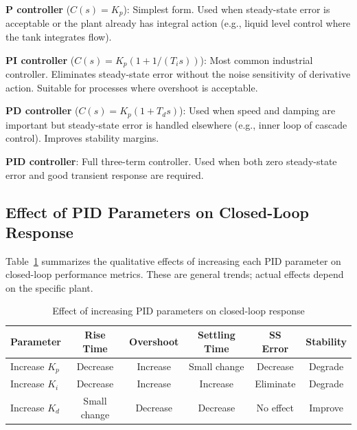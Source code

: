 \textbf{P controller} ($C(s) = K_p$): Simplest form. Used when steady-state error is acceptable or the plant already has integral action (e.g., liquid level control where the tank integrates flow).

\textbf{PI controller} ($C(s) = K_p(1 + 1/(T_i s))$): Most common industrial controller. Eliminates steady-state error without the noise sensitivity of derivative action. Suitable for processes where overshoot is acceptable.

\textbf{PD controller} ($C(s) = K_p(1 + T_d s)$): Used when speed and damping are important but steady-state error is handled elsewhere (e.g., inner loop of cascade control). Improves stability margins.

\textbf{PID controller}: Full three-term controller. Used when both zero steady-state error and good transient response are required.

\subsection{Effect of PID Parameters on Closed-Loop Response}
\label{subsec:pid_effects}

Table~\ref{tab:pid_effects} summarizes the qualitative effects of increasing each PID parameter on closed-loop performance metrics. These are general trends; actual effects depend on the specific plant.

\begin{table}[htbp]
\centering
\caption{Effect of increasing PID parameters on closed-loop response}
\label{tab:pid_effects}
\begin{tabular}{@{}lccccc@{}}
\toprule
\textbf{Parameter} & \textbf{Rise Time} & \textbf{Overshoot} & \textbf{Settling Time} & \textbf{SS Error} & \textbf{Stability} \\
\midrule
Increase $K_p$ & Decrease & Increase & Small change & Decrease & Degrade \\
Increase $K_i$ & Decrease & Increase & Increase & Eliminate & Degrade \\
Increase $K_d$ & Small change & Decrease & Decrease & No effect & Improve \\
\bottomrule
\end{tabular}
\end{table}


